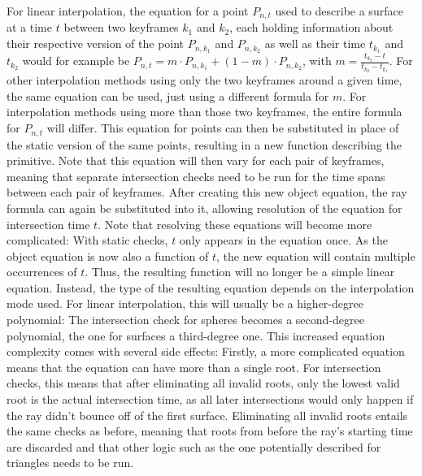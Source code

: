 For linear interpolation,
the equation for a point \(P_{n, t}\) used to describe a surface at a time \(t\) between two keyframes \(k_1\) and \(k_2\),
each holding information about their respective version of the point \(P_{n, k_1}\) and \(P_{n, k_2}\)
as well as their time \(t_{k_1}\) and \(t_{k_2}\)
would for example be \(P_{n, t} = m \cdot P_{n, k_1} + (1-m) \cdot P_{n, k_2}\),
with \(m = \frac{t_{k_2} - t}{t_{k_2} - t_{k_1}}\).
For other interpolation methods using only the two keyframes around a given time,
the same equation can be used, just using a different formula for \(m\).
For interpolation methods using more than those two keyframes,
the entire formula for \(P_{n, t}\) will differ.
\newline
This equation for points can then be substituted in place of the static version of the same points,
resulting in a new function describing the primitive.
Note that this equation will then vary for each pair of keyframes,
meaning that separate intersection checks need to be run for the time spans between each pair of keyframes.
\newline
After creating this new object equation, the ray formula can again be substituted into it,
allowing resolution of the equation for intersection time \(t\).
Note that resolving these equations will become more complicated:
With static checks, \(t\) only appears in the equation once.
As the object equation is now also a function of \(t\),
the new equation will contain multiple occurrences of \(t\).
\newline
Thus, the resulting function will no longer be a simple linear equation.
Instead, the type of the resulting equation depends on the interpolation mode used.
For linear interpolation, this will usually be a higher-degree polynomial:
The intersection check for spheres becomes a second-degree polynomial,
the one for surfaces a third-degree one.
\newline
This increased equation complexity comes with several side effects:
Firstly, a more complicated equation means that the equation can have more than a single root.
For intersection checks, this means that after eliminating all invalid roots,
only the lowest valid root is the actual intersection time,
as all later intersections would only happen if the ray didn't bounce off of the first surface.
\newline
Eliminating all invalid roots entails the same checks as before,
meaning that roots from before the ray's starting time are discarded
and that other logic such as the one potentially described for triangles needs to be run.
